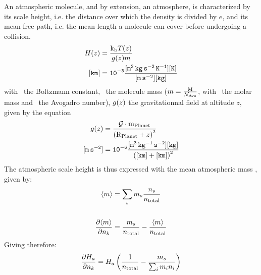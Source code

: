 An atmospheric molecule, and by extension, an atmosphere, is characterized by
its scale height, i.e. the distance over which the density is divided by $e$, and
its mean free path, i.e. the mean length a molecule can cover before undergoing
a collision.
\begin{equation}
\begin{split}
H(z)  &    = \frac{\text{k}_\text{b} T(z)}{g(z)m} \\
\tt [km] &\tt = 10^{-3} \frac{[\mathtt{m^2\,kg\,s^{-2}\,K^{-1}}] [K]}{[m\,s^{-2}][kg]}
\end{split}
\label{scale_height}
\end{equation}
with \kb\ the Boltzmann constant, 
\mass\ the molecule mass ($m = \frac{\text{M}}{\mathcal{N}_\text{Avo}}$, with
\Mm\ the molar mass and \Nav\ the Avogadro number), 
$g(z)$ the gravitationnal field at altitude $z$, given by the equation
\begin{equation}
\begin{split}
g(z)        &     = \frac{\mathcal{G}\cdot\text{m}_\text{Planet}}{\left(\text{R}_\text{Planet} + z\right)^2} \\
\tt [m\,s^{-2}] & \tt = 10^{-6} \frac{[\mathtt{m^3\,kg^{-1}\,s^{-2}}] [kg]}{\left([km] + [km]\right)^2}
\end{split}
\label{gfield}
\end{equation}
%
The atmospheric scale height is thus expressed with the mean atmospheric
mass , given by:
\begin{equation}
\begin{split}
\langle m\rangle & = \sum_s m_s \frac{n_s}{n_\text{total}} \\\\
\frac{\partial\langle m\rangle}{\partial n_k} & = \frac{m_s}{n_\text{total}} - \frac{\langle m\rangle}{n_\text{total}}
\end{split}
\end{equation}
%
Giving therefore:
\begin{equation}
\frac{\partial H_a}{\partial n_k} =  H_a\left(\frac{1}{n_\text{total}} - \frac{m_s}{\sum_im_in_i}\right)
\end{equation}

